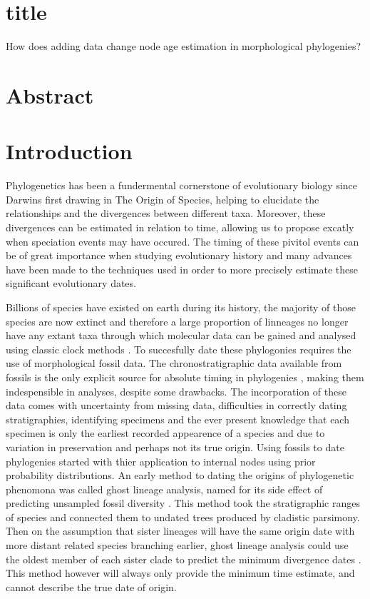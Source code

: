 \documentclass[11pt,letterpaper]{article}
\begin{document}
\section{title}

How does adding data change node age estimation in morphological phylogenies?

\section*{Abstract}

\linenumbers

\section*{Introduction}

Phylogenetics has been a fundermental cornerstone of evolutionary biology since Darwins first drawing in The Origin of Species, helping to elucidate the relationships and the divergences between different taxa. Moreover, these divergences can be estimated in relation to time, allowing us to propose excatly when speciation events may have occured. The timing of these pivitol events can be of great importance when studying evolutionary history and many advances have been made to the techniques used in order to more precisely estimate these significant evolutionary dates.

Billions of species have existed on earth during its history, the majority of those species are now extinct and therefore a large proportion of linneages no longer have any extant taxa through which molecular data can be gained and analysed using classic clock methods \citep{turner2017empirical}. To succesfully date these phylogonies requires the  use of morphological fossil data. The chronostratigraphic data available from fossils is the only explicit source for absolute timing in phylogenies \citep{turner2017empirical}, making them indespensible in analyses, despite some drawbacks. The incorporation of these data comes with uncertainty from missing data, difficulties in correctly dating stratigraphies, identifying specimens and the ever present knowledge that each specimen is only the earliest recorded appearence of a species and due to variation in preservation and perhaps not its true origin. Using fossils to date phylogenies started with thier application to internal nodes using prior probability distributions. An early method to dating the origins of phylogenetic phenomona was called ghost lineage analysis, named for its side effect of predicting unsampled fossil diversity \citep{norell1992taxic}. This method took the stratigraphic ranges of species and connected them to undated trees produced by cladistic parsimony. Then on the assumption that sister lineages will have the same origin date with more distant related species branching earlier, ghost lineage analysis could use the oldest member of each sister clade to predict the minimum divergence dates \citep{norell1992taxic}. This method however will always only provide the minimum time estimate, and cannot describe the true date of origin. 
\end{document}

